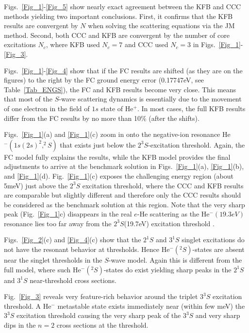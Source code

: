 \documentclass[aip
, pra
, showpacs
, aps
, twocolumn
, groupedaddress
, floatfix
]{revtex4}
\begin{document}
Figs.~\ref{Fig_1}-\ref{Fig_5} show nearly exact agreement between the KFB and CCC methods yielding two important conclusions.
First, it confirms that the KFB results are convergent by $N$ when solving the scattering equations via the JM method.
Second, both CCC and KFB are convergent by the number of core excitations $N_c$, where KFB used $N_c=7$ and CCC used $N_c=3$ in Figs.~\ref{Fig_1}-\ref{Fig_3}.

Figs.~\ref{Fig_1}-\ref{Fig_4} show that if the FC results are shifted (as they are on the figures) to the right by the FC ground energy error (0.17747eV, see Table~\ref{Tab_ENGS}),
the FC and KFB results become very close. This means that most of the $S$-wave scattering dynamics  is essentially due to
the movement of one electron in the field of $1s$ state of He$^+$. In most cases, the full KFB results differ from the FC results by no more than 10\% (after the shifts).


Figs.~\ref{Fig_1}(a) and \ref{Fig_1}(c) zoom in onto the negative-ion resonance He$^-(1s(2s)^2,^2S)$ that exists just below the $2^3S$-excitation threshold.
Again, the FC model fully explains the results, while the KFB model provides the final adjustments to arrive at the benchmark solution in Figs.~\ref{Fig_1}(a), \ref{Fig_1}(b), and \ref{Fig_1}(d). 
Fig.~\ref{Fig_1}(c) exposes the challenging energy region (about 5meV) just above the $2^3S$ excitation threshold, 
where the CCC and KFB results are comparable but slightly different and therefore only the CCC results should be considered as the benchmark solution at this region.
Note that the very sharp peak (Fig.~\ref{Fig_1}c) disappears in the real $e$-He scattering \cite{KM95pL139, HBSBB96} as the He$^-(19.3eV)$ resonance \cite{Schulz73, BC94, HY99} 
lies too far away from the $2^3S$(19.7eV) excitation threshold \cite{HBSBB96}.


Figs.~\ref{Fig_2}(c) and \ref{Fig_4}(c) show that the $2^1S$ and $3^1S$ singlet excitations do not have the resonant behavior at thresholds. 
Hence He$^-(^2S)$-states are absent near the singlet thresholds in the $S$-wave model. 
Again this is different from the full model, where such He$^-(^2S)$-states do exist yielding sharp peaks in the $2^1S$ \cite{KM95pL139, HBSBB96} and $3^1S$ \cite{SMC2006} near-threshold cross sections.


Fig.~\ref{Fig_3} reveals very feature-rich  behavior around the triplet $3^3S$  excitation threshold. 
A He$^-$ metastable state exists immediately near (within few meV) the  $3^3S$  excitation threshold
causing the very sharp peak of the $3^3S$ and very sharp dips in the $n=2$ cross sections at the threshold.
\end{document}
